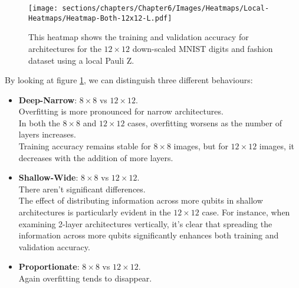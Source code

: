 \begin{figure}[h]
    \centering
    \texttt{[image: sections/chapters/Chapter6/Images/Heatmaps/Local-Heatmaps/Heatmap-Both-12x12-L.pdf]}
    \caption{This heatmap shows the training and validation accuracy for architectures for the $12\times12$ down-scaled MNIST digits and fashion dataset using a local Pauli Z.}
    \label{fig:heatmap-12x12-L}
\end{figure}

By looking at figure \ref{fig:heatmap-12x12-L}, we can distinguish 
three different behaviours:

\begin{itemize}
    \item \textbf{Deep-Narrow}: $8 \times 8$ vs $12 \times 12$.\\
    Overfitting is more pronounced for narrow architectures.\\
    In both the $8 \times 8$ and $12 \times 12$ cases, overfitting worsens as the number of layers increases. \\
    Training accuracy remains stable for $8 \times 8$ images, but for $12 \times 12$ images, 
    it decreases with the addition of more layers.
    \item \textbf{Shallow-Wide}: $8 \times 8$ vs $12 \times 12$.\\
    There aren't significant differences.\\
    The effect of distributing information across more qubits in shallow architectures is particularly 
    evident in the $12 \times 12$ case. For instance, when examining 2-layer architectures vertically, 
    it's clear that spreading the information across more qubits significantly enhances both training and 
    validation accuracy.
    \item \textbf{Proportionate}: $8 \times 8$ vs $12 \times 12$.\\
    Again overfitting tends to disappear. \\
 \end{itemize}